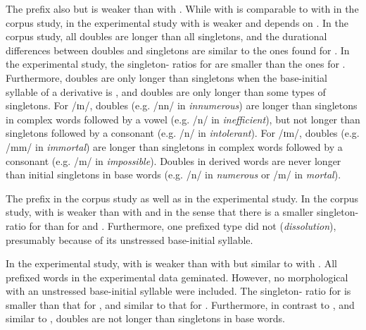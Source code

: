 The prefix  also  but  is weaker than  with . While  with  is comparable to  with  in the corpus study, in the experimental study  with  is weaker and depends on . 
 In the corpus study, 
 all doubles are longer than all singletons, and the durational differences between doubles and singletons are similar to the ones found for . 
In the experimental study, 
the singleton- ratios for  are smaller than the ones for .
Furthermore, doubles are only longer than singletons when the base-initial syllable of a derivative is , and doubles are only longer than some types of singletons. For /ɪn/, doubles (e.g. /nn/ in \textit{innumerous}) are longer than singletons in complex words followed by a vowel (e.g. /n/ in \textit{inefficient}), but not longer than singletons followed by a consonant (e.g. /n/ in \textit{intolerant}). For /ɪm/, doubles (e.g. /mm/ in \textit{immortal}) are longer than singletons in complex words followed by a consonant (e.g. /m/ in \textit{impossible}). Doubles in derived words are never longer than initial singletons in base words (e.g. /n/ in \textit{numerous} or /m/ in \textit{mortal}). 




The prefix   in the corpus study as well as in the experimental study. In the corpus study,  with  is weaker than  with  and  in the sense that there is a smaller singleton- ratio for  than for  and . Furthermore, one prefixed type did not  (\textit{dissolution}), presumably because of its unstressed base-initial syllable. 

In the experimental study,  with  is weaker than  with  but similar to  with .
All prefixed words in the experimental data geminated. However, no morphological  with an unstressed base-initial syllable were included. 
The singleton- ratio for  is smaller than that for , and similar to that for . 
Furthermore, in contrast to , and similar to , doubles are not longer than singletons in base words.  


